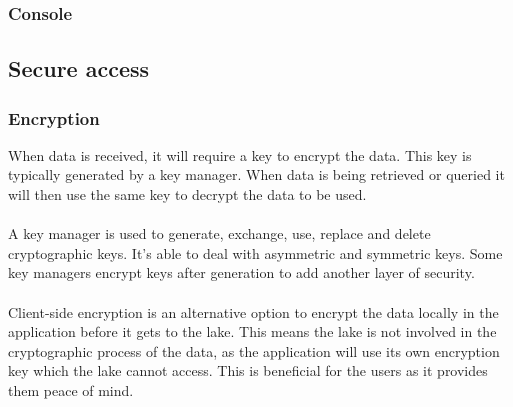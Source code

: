 \documentclass[10pt]{article}
\begin{document}
\subsubsection{Console}

\subsection{Secure access}
\subsubsection{Encryption}

When data is received, it will require a key to encrypt the data. This key is typically generated by a key manager. When data is being retrieved or queried it will then use the same key to decrypt the data to be used.
\\ \\
A key manager is used to generate, exchange, use, replace and delete cryptographic keys. It's able to deal with asymmetric and symmetric keys. Some key managers encrypt keys after generation to add another layer of security.
\\ \\
Client-side encryption is an alternative option to encrypt the data locally in the application before it gets to the lake. This means the lake is not involved in the cryptographic process of the data, as the application will use its own encryption key which the lake cannot access. This is beneficial for the users as it provides them peace of mind.
\end{document}
